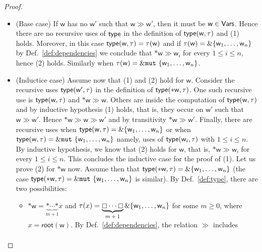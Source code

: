 \begin{proof}
  \begin{itemize}
  \item (Base case)
    If $\mathsf{w}$
    has no $\mathsf{w}'$ such that $\mathsf{w}\gg\mathsf{w}'$, then it must be $\mathsf{w}\in\mathsf{Vars}$.
    Hence there are no recursive uses of $\mathsf{type}$ in the definition of
    $\mathsf{type}(\mathsf{w},\tau)$ and (1) holds. Moreover, in this case
    $\mathsf{type}(\mathsf{w},\tau)=\tau(\mathsf{w})$ and if
    $\tau(\mathsf{w})=\&\{\mathsf{w}_1,\ldots,\mathsf{w}_n\}$ by Def.~\ref{def:dependencies}
    we conclude that $\mathtt{*}\mathsf{w}\gg\mathsf{w}_i$ for every $1\le i\le n$, hence (2) holds.
    Similarly when $\tau(\mathsf{w})=\&\mathtt{mut}\ \{\mathsf{w}_1,\ldots,\mathsf{w}_n\}$.
  \item (Inductice case)
    Assume now that (1) and (2) hold for $\mathsf{w}$. Consider
    the recursive uses $\mathsf{type}(\mathsf{w}',\tau)$ in the definition of
    $\mathsf{type}(\mathtt{*}\mathsf{w},\tau)$. One such recursive use is
    $\mathsf{type}(\mathsf{w},\tau)$ and $\mathtt{*}\mathsf{w}\gg\mathsf{w}$.
    Others are inside the computation of $\mathsf{type}(\mathsf{w},\tau)$ and by inductive hypothesis
    (1) holds, that is, they occur on $\mathsf{w}'$ such that $\mathsf{w}\gg\mathsf{w}'$.
    Hence $\mathtt{*}\mathsf{w}\gg\mathsf{w}\gg\mathsf{w}'$ and by transitivity
    $\mathtt{*}\mathsf{w}\gg\mathsf{w}'$. Finally, there are recursive uses
    when $\mathsf{type}(\mathsf{w},\tau)=\&\{\mathsf{w}_1,\ldots,\mathsf{w}_n\}$
    or when $\mathsf{type}(\mathsf{w},\tau)=\&\mathtt{mut}\ \{\mathsf{w}_1,\ldots,\mathsf{w}_n\}$
    namely, uses of
    $\mathsf{type}(\mathsf{w}_i,\tau)$ with $1\le i\le n$. By inductive hypothesis, we know that
    (2) holds for $\mathsf{w}$, that is, $\mathtt{*}\mathsf{w}\gg\mathsf{w}_i$ for every
    $1\le i\le n$. This concludes the inductive case for the proof of (1).
    Let us prove (2) for $\mathtt{*}\mathsf{w}$ now. Assume then that
    $\mathsf{type}(\mathtt{*}\mathsf{w},\tau)=\&\{\mathsf{w}_1,\ldots,\mathsf{w}_n\}$ (the case
    $\mathsf{type}(\mathtt{*}\mathsf{w},\tau)=\&\mathtt{mut}\ \{\mathsf{w}_1,\ldots,\mathsf{w}_n\}$ is similar).
    By Def.~\ref{def:type}, there are two possibilities:
    \begin{itemize}
    \item $\mathtt{*}\mathsf{w}=\underbrace{\mathtt{*}\cdots\mathtt{*}}_{\text{$m+1$}}x$
      and $\tau(x)=\underbrace{\boxempty\cdots\boxempty}_{\text{$m+1$}}
      \&\{\mathsf{w}_1,\ldots,\mathsf{w}_n\}$
      for some $m\ge 0$, where $x=\mathsf{root}(\mathsf{w})$.
      By Def.~\ref{def:dependencies}, the relation $\gg$ includes
      \begin{align*}

\end{align*}
\end{itemize}
\end{itemize}
\end{proof}
